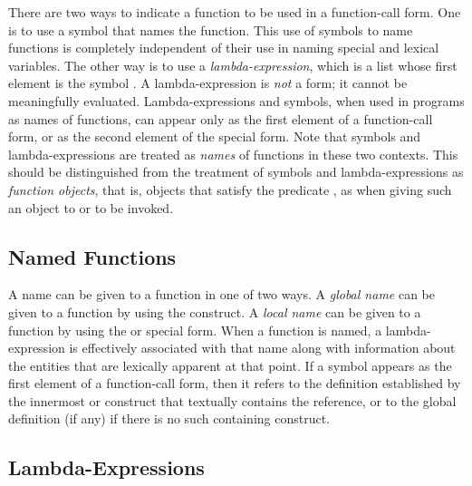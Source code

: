 There are two ways to indicate a function to be used in a function-call
form.  One is to use a symbol that names the function.  This use of
symbols to name functions is completely independent of their use in
naming special and lexical variables.  The other way is to use a
{\it lambda-expression}, which is a list whose first element is the symbol
.  A lambda-expression is {\it not} a form; it cannot be
meaningfully evaluated.  Lambda-expressions and symbols, when used in
programs as names of functions, can appear only as the first element of a
function-call form, or as the second element of the 
special form.  Note that symbols and lambda-expressions are treated as
{\it names} of functions in these two contexts.  This should be
distinguished from the treatment of symbols and lambda-expressions as
{\it function objects}, that is,
objects that satisfy the predicate ,
as when giving such an object to  or  to be
invoked.

\subsection{Named Functions}

A name can be given to a function in one of two ways.
A {\it global name} can be given to a function by using the
 construct.
A {\it local name} can be given to a function by using the
 or
 special form.
When a function is named, a lambda-expression is effectively
associated with that name
along with information about the entities that are lexically apparent
at that point.
If a symbol appears as the first element of a function-call form, then it
refers to the definition established by the innermost  or 
construct that textually contains the reference, or to the global
definition (if any) if there is no such containing construct.

\subsection{Lambda-Expressions}
\label{LAMBDA-EXPRESSIONS-SECTION}

